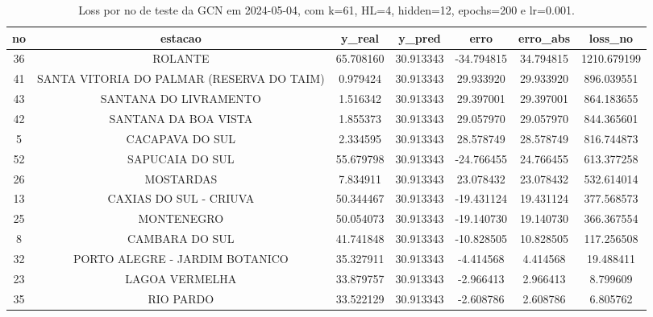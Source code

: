 \begin{table}[h]
\centering
\caption{Loss por no de teste da GCN em 2024-05-04, com k=61, HL=4, hidden=12, epochs=200 e lr=0.001.}
\label{tab:gcn_loss_k61_hl4_h12_e200_d20240504}
\begin{tabular}{ccccccc}
\toprule
no & estacao & y\_real & y\_pred & erro & erro\_abs & loss\_no \\
\midrule
36 & ROLANTE & 65.708160 & 30.913343 & -34.794815 & 34.794815 & 1210.679199 \\
41 & SANTA VITORIA DO PALMAR (RESERVA DO TAIM) & 0.979424 & 30.913343 & 29.933920 & 29.933920 & 896.039551 \\
43 & SANTANA DO LIVRAMENTO & 1.516342 & 30.913343 & 29.397001 & 29.397001 & 864.183655 \\
42 & SANTANA DA BOA VISTA & 1.855373 & 30.913343 & 29.057970 & 29.057970 & 844.365601 \\
5 & CACAPAVA DO SUL & 2.334595 & 30.913343 & 28.578749 & 28.578749 & 816.744873 \\
52 & SAPUCAIA DO SUL & 55.679798 & 30.913343 & -24.766455 & 24.766455 & 613.377258 \\
26 & MOSTARDAS & 7.834911 & 30.913343 & 23.078432 & 23.078432 & 532.614014 \\
13 & CAXIAS DO SUL - CRIUVA & 50.344467 & 30.913343 & -19.431124 & 19.431124 & 377.568573 \\
25 & MONTENEGRO & 50.054073 & 30.913343 & -19.140730 & 19.140730 & 366.367554 \\
8 & CAMBARA DO SUL & 41.741848 & 30.913343 & -10.828505 & 10.828505 & 117.256508 \\
32 & PORTO ALEGRE - JARDIM BOTANICO & 35.327911 & 30.913343 & -4.414568 & 4.414568 & 19.488411 \\
23 & LAGOA VERMELHA & 33.879757 & 30.913343 & -2.966413 & 2.966413 & 8.799609 \\
35 & RIO PARDO & 33.522129 & 30.913343 & -2.608786 & 2.608786 & 6.805762 \\
\bottomrule
\end{tabular}
\end{table}
